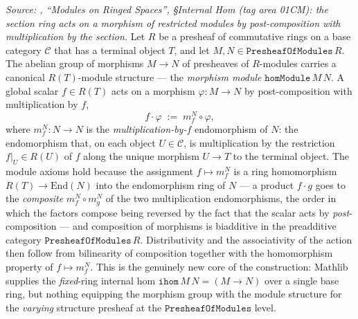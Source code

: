 \begin{definition}\leanok
  \label{def:presheaf_internal_hom_value}
  \textit{Source: \cite{stacks-project}, ``Modules on Ringed Spaces'', \S Internal Hom
  (tag area 01CM): the section ring acts on a morphism of restricted modules by
  post-composition with multiplication by the section.}
  Let \(R\) be a presheaf of commutative rings on a base category \(\mathcal{C}\)
  that has a terminal object \(T\), and let \(M, N \in \mathtt{PresheafOfModules}\,R\).
  The abelian group of morphisms \(M \longrightarrow N\) of presheaves of \(R\)-modules
  carries a canonical \(R(T)\)-module structure --- the \emph{morphism module}
  \(\mathtt{homModule}\,M\,N\). A global scalar \(f \in R(T)\) acts on a morphism
  \(\varphi : M \to N\) by post-composition with multiplication by \(f\),
  \[
    f \cdot \varphi \;:=\; m_f^{N} \circ \varphi,
  \]
  where \(m_f^{N} : N \to N\) is the \emph{multiplication-by-\(f\)} endomorphism of
  \(N\): the endomorphism that, on each object \(U \in \mathcal{C}\), is multiplication
  by the restriction \(f|_U \in R(U)\) of \(f\) along the unique morphism \(U \to T\)
  to the terminal object. The module axioms hold because the assignment
  \(f \mapsto m_f^{N}\) is a ring homomorphism \(R(T) \to \mathrm{End}(N)\) into the
  endomorphism ring of \(N\) --- a product \(f \cdot g\) goes to the \emph{composite}
  \(m_f^{N} \circ m_g^{N}\) of the two multiplication endomorphisms, the order in which
  the factors compose being reversed by the fact that the scalar acts by
  \emph{post}-composition --- and composition of morphisms is biadditive in the
  preadditive category \(\mathtt{PresheafOfModules}\,R\). Distributivity and the
  associativity of the action then follow from bilinearity of composition together with
  the homomorphism property of \(f \mapsto m_f^{N}\). This is the genuinely new core of
  the construction: Mathlib supplies the \emph{fixed}-ring internal hom
  \(\mathtt{ihom}\,M\,N = (M \to N)\) over a single base ring, but nothing equipping the
  morphism group with the module structure for the \emph{varying} structure presheaf at
  the \(\mathtt{PresheafOfModules}\) level.
\end{definition}

